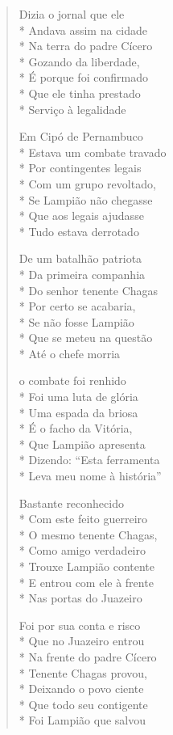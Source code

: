 \begin{verse}
Dizia o jornal que ele\\*
Andava assim na cidade\\*
Na terra do padre Cícero\\*
Gozando da liberdade,\\*
É porque foi confirmado\\*
Que ele tinha prestado\\*
Serviço à legalidade

Em Cipó de Pernambuco\\*
Estava um combate travado\\*
Por contingentes legais\\*
Com um grupo revoltado,\\*
Se Lampião não chegasse\\*
Que aos legais ajudasse\\*
Tudo estava derrotado

De um batalhão patriota\\*
Da primeira companhia\\*
Do senhor tenente Chagas\\*
Por certo se acabaria,\\*
Se não fosse Lampião\\*
Que se meteu na questão\\*
Até o chefe morria

o combate foi renhido\\*
Foi uma luta de glória\\*
Uma espada da briosa\\*
É o facho da Vitória,\\*
Que Lampião apresenta\\*
Dizendo: ``Esta ferramenta\\*
Leva meu nome à história''

Bastante reconhecido\\*
Com este feito guerreiro\\*
O mesmo tenente Chagas,\\*
Como amigo verdadeiro\\*
Trouxe Lampião contente\\*
E entrou com ele à frente\\*
Nas portas do Juazeiro

Foi por sua conta e risco\\*
Que no Juazeiro entrou\\*
Na frente do padre Cícero\\*
Tenente Chagas provou,\\*
Deixando o povo ciente\\*
Que todo seu contigente\\*
Foi Lampião que salvou


\end{verse}
